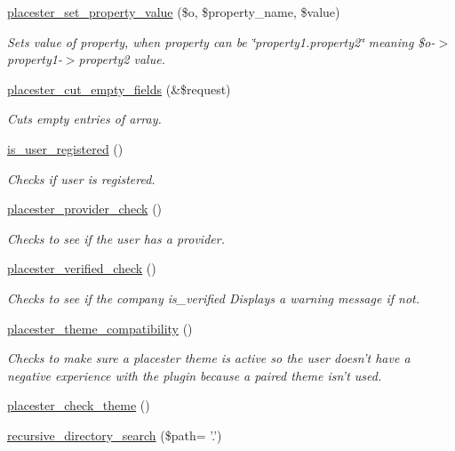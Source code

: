 \begin{DoxyCompactItemize}
\hyperlink{util_8php_a40d9caa6b67193fa0b69d8ef930d5890}{placester\_\-set\_\-property\_\-value} (\$o, \$property\_\-name, \$value)
\begin{DoxyCompactList}\small\item\em Sets value of property, when property can be \char`\"{}property1.property2\char`\"{} meaning \$o-\/$>$property1-\/$>$property2 value. \end{DoxyCompactList}\item 
\hyperlink{util_8php_ac0ea178d0bd8dd55f0a707c6d8060f27}{placester\_\-cut\_\-empty\_\-fields} (\&\$request)
\begin{DoxyCompactList}\small\item\em Cuts empty entries of array. \end{DoxyCompactList}\item 
\hyperlink{util_8php_aa01a199cdc25e7126fed093246993ef9}{is\_\-user\_\-registered} ()
\begin{DoxyCompactList}\small\item\em Checks if user is registered. \end{DoxyCompactList}\item 
\hyperlink{util_8php_afda26f1daebcac77ead9728047e3baf8}{placester\_\-provider\_\-check} ()
\begin{DoxyCompactList}\small\item\em Checks to see if the user has a provider. \end{DoxyCompactList}\item 
\hyperlink{util_8php_aff4ecd2916fd82ef0f1ff14bb35e3ab3}{placester\_\-verified\_\-check} ()
\begin{DoxyCompactList}\small\item\em Checks to see if the company is\_\-verified Displays a warning message if not. \end{DoxyCompactList}\item 
\hyperlink{util_8php_a77dff521aeece39fa05ada39d8d668f5}{placester\_\-theme\_\-compatibility} ()
\begin{DoxyCompactList}\small\item\em Checks to make sure a placester theme is active so the user doesn't have a negative experience with the plugin because a paired theme isn't used. \end{DoxyCompactList}\item 
\hyperlink{util_8php_ab7a21a2585a504e4d3fbae19133ad464}{placester\_\-check\_\-theme} ()
\item 
\hyperlink{util_8php_a4bb1db85f1c91c96f5c9a04ce2965b99}{recursive\_\-directory\_\-search} (\$path= '.')

\end{DoxyCompactItemize}
